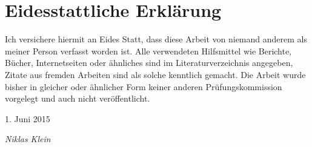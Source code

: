 \section*{Eidesstattliche Erklärung}

Ich versichere hiermit an Eides Statt, dass diese Arbeit von niemand anderem als meiner Person verfasst worden ist.
Alle verwendeten Hilfsmittel wie Berichte, Bücher, Internetseiten oder ähnliches sind im Literaturverzeichnis angegeben,
Zitate aus fremden Arbeiten sind als solche kenntlich gemacht. Die Arbeit wurde bisher in gleicher oder ähnlicher Form
keiner anderen Prüfungskommission vorgelegt und auch nicht veröffentlicht.

\vspace{3cm}

1. Juni 2015

\vspace{1.5cm}

\textit{Niklas Klein}